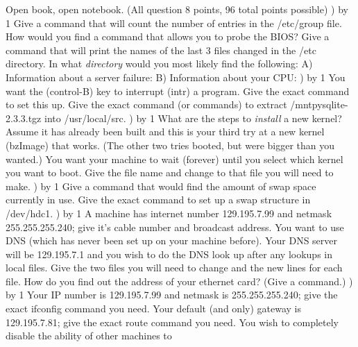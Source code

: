 
\parindent=0in
\nopagenumbers
\newcount\quesno
{}
\def\ques{\number\quesno) \advance\quesno by 1}
\def\aspace{\vskip 1.5in}

Open book, open notebook. (All question 8 points, 96 total points possible)
\hfill\break
\ques
Give a command that will count the number of entries in the {\ltt{}/etc/group}
file.
\vskip 0.4in
How would you find a command that allows you to probe the BIOS?
\vskip 0.4in
Give a command that will print the names of the last 3 files changed in
the {\ltt{}/etc} directory.
\vskip 0.4in
In what {\it directory} would you most likely find
the following:
\hfill\break
A) Information about a server failure:
\vskip 0.3in
B) Information about your CPU:
\vskip 0.3in
\ques
You want the ({\ltt{}control-B}) key to interrupt ({\ltt{}intr})
a program. Give the exact command to set this up.
\vskip 0.4in
Give the exact command (or commands) to extract
{\ltt{}/mntpysqlite-2.3.3.tgz} into {\ltt{}/usr/local/src}.
\vskip 1.0in
\ques
What are the steps to {\it install} a new kernel?
Assume it has already been built and this is your third try at a new
kernel ({\ltt{}bzImage}) that works. (The other two tries booted, but
were bigger than you wanted.)
\vskip 1.5in
You  want your machine to wait (forever) until you select which kernel
you want to boot. Give the file name and
change to that file you will need to make.
\vskip 0.8in
\vfill\eject
\ques
Give a command that would find the amount of swap space currently in use.
\vskip 0.4in
Give the exact command to set up a swap structure in
{\ltt{}/dev/hdc1}.
\vskip 0.4in
\ques
A machine has internet number {\ltt{}129.195.7.99} and
netmask {\ltt{}255.255.255.240}; give it's cable number and broadcast address.
\vskip 1.0in
You want to use DNS (which has never been set up on your machine before).
Your DNS server will be {\ltt{}129.195.7.1} and you wish to do the DNS
look up after any lookups in local files.
Give the two files you will need to change and the new lines for each file.
\vskip 0.8in
How do you find out the address of your ethernet card?
(Give a command.)
\vskip 0.4in
\ques
Your IP number is {\ltt{}129.195.7.99} and netmask is {\ltt{}255.255.255.240};
give the exact {\ltt{}ifconfig} command you need.
\vskip 0.4in
Your default (and only) gateway is {\ltt{}129.195.7.81};
give the exact {\ltt{}route} command you need.
\vskip 0.4in
You wish to completely disable the ability of other machines to 
